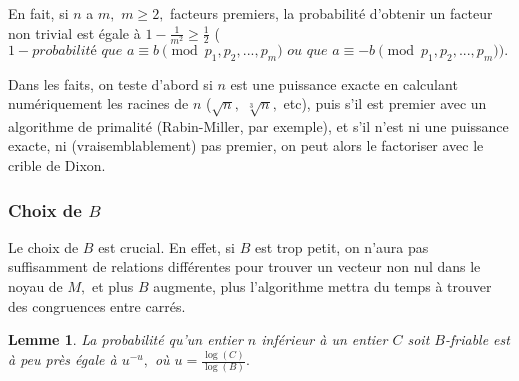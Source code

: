 \documentclass[french, 12pt, titlepage]{article}
\newtheorem{lemme}{Lemme}
\begin{document}
En fait, si $n$ a $m,$ $m \geq 2,$ facteurs premiers, la probabilité d'obtenir un
facteur non trivial est égale à $1 - \frac{1}{m^2} \geq \frac{1}{2}$
($1 - \textit{probabilité que } a \equiv b \pmod {p_1, p_2, ..., p_m} \textit{ ou que } a \equiv -b \pmod {p_1, p_2, ..., p_m}).$

Dans les faits, on teste d'abord si $n$ est une puissance exacte en calculant numériquement les racines de $n$ ($\sqrt{n},$ $\sqrt[3]{n},$ etc), puis s'il est premier avec un algorithme de primalité (Rabin-Miller, par
exemple), et s'il n'est ni une puissance exacte, ni (vraisemblablement) pas premier, on peut alors le
factoriser avec le crible de Dixon.


\subsubsection{Choix de $B$}

Le choix de $B$ est crucial. En effet, si $B$ est trop petit, on
n'aura pas suffisamment de relations différentes pour trouver un
vecteur non nul dans le noyau de $M,$ et plus $B$ augmente, plus
l'algorithme mettra du temps à trouver des congruences entre carrés. 

\begin{lemme}
La probabilité qu'un entier $n$ inférieur à un entier $C$ soit
$B$-friable est à peu près égale à $u^{-u},$ où $u = \frac{\log(C)}{\log(B)}.$
\end{lemme}
\end{document}
